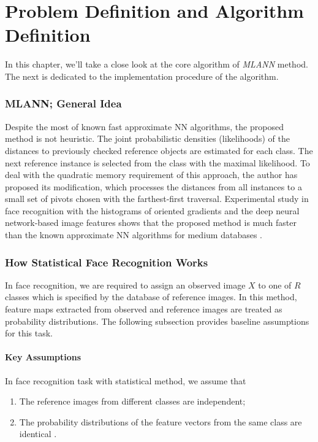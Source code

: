 \chapter{Problem Definition and Algorithm Definition}

In this chapter, we'll take a close look at the core algorithm of \textit{MLANN} method. The next is dedicated to the implementation procedure of the algorithm.

\subsection{MLANN; General Idea} 
Despite the most of known fast approximate NN algorithms, the proposed method is not heuristic. The joint probabilistic densities (likelihoods) of the distances to previously checked reference objects are estimated for each class. The next reference instance is selected from the class with the maximal likelihood. To deal with the quadratic memory requirement of this approach, the author has proposed its modification, which processes the distances from all instances to a small set of pivots chosen with the farthest-first traversal. Experimental study in face recognition with the histograms of oriented gradients and the deep neural network-based image features shows that the proposed method is much faster than the known approximate NN algorithms for medium databases \cite{def1}.

\subsection{How Statistical Face Recognition Works}
In face recognition, we are required to assign an observed image $X$ to one of $R$ classes which is specified by the database of reference images. In this method, feature maps extracted from observed and reference images are treated as probability distributions. The following subsection provides baseline assumptions for this task.

\subsubsection{Key Assumptions}
In face recognition task with statistical method, we assume that
\begin{enumerate}
	\item The reference images from different classes are independent;
	\item The probability distributions of the feature vectors from the same class are identical \cite{def1}.
\end{enumerate}

